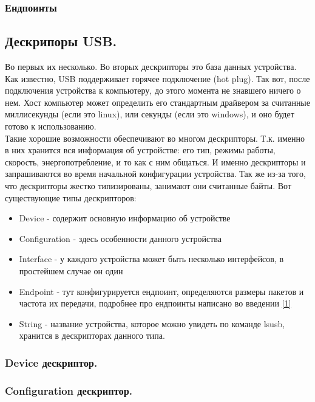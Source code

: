\documentclass[12pt,a4paper]{article}
\begin{document}
\subsubsection{Ендпоинты}

\subsection{Дескрипоры USB.}\label{158500}
    Во первых их несколько. Во вторых дескрипторы это база данных устройства.
    Как известно,
    USB поддерживает горячее подключение (hot plug). Так вот, после подключения
    устройства к компьютеру, до этого момента не знавшего ничего о нем. Хост
    компьютер может определить его стандартным драйвером за считанные
    миллисекунды (если это linux), или секунды
    (если это windows), и оно будет готово к использованию.\\
    Такие хорошие возможности обеспечивают во многом дескрипторы. Т.к. именно
    в них хранится вся информация об устройстве: его тип, режимы работы,
    скорость, энергопотребление, и то как с ним общаться. И именно дескрипторы
    и запрашиваются во время начальной конфигурации устройства. Так же из-за
    того, что дескрипторы жестко типизированы, занимают они считанные байты.
    Вот существующие типы дескрипторов:
\begin{itemize}
    \item Device - содержит основную информацию об устройстве
    \item Configuration - здесь особенности данного устройства
    \item Interface - у каждого устройства может быть несколько интерфейсов,
    в простейшем случае он один
    \item Endpoint - тут конфигурируется ендпоинт,
    определяются размеры пакетов и частота их передачи, подробнее про ендпоинты
    написано во введении \ref{1}
    \item String - название устройства, которое можно увидеть по команде lsusb,
    хранится в дескрипторах данного типа.
\end{itemize}
    


\subsubsection{Device дескриптор.}

\subsubsection{Configuration дескриптор.}
\end{document}
